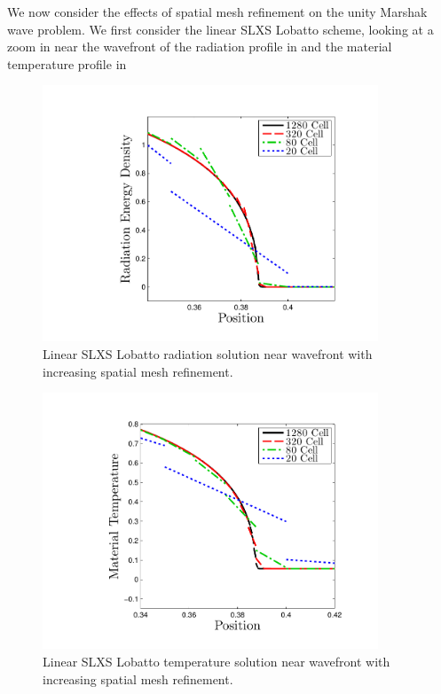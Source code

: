 We now consider the effects of spatial mesh refinement on the unity Marshak wave problem.  
We first consider the linear SLXS Lobatto scheme, looking at a zoom in near the wavefront of the radiation profile in  and the material temperature profile in 
\begin{figure}[!hbp]
\centering
\includegraphics[width=10cm,trim=1.0in  0.2in 0.5in 0.5in,clip=true]{chapter6_grey_radtran/Dissertation_Data/Reorder_Marshak_Zoom_Radiation_SL_Lobatto_P1_Cell_Refinement.pdf}
\caption{Linear SLXS Lobatto radiation solution near wavefront with increasing spatial mesh refinement.}
\label{fig:lobatto_convergence_rad}
\end{figure}
%
%
\begin{figure}[!htp]
\centering
\includegraphics[width=10cm,trim=1.0in  0.2in 0.5in 0.5in,clip=true]{chapter6_grey_radtran/Dissertation_Data/Reorder_Marshak_Zoom_Temperature_SL_Lobatto_P1_Cell_Refinement.pdf}
\caption{Linear SLXS Lobatto temperature solution near wavefront with increasing spatial mesh refinement.}
\label{fig:lobatto_convergence_temp}
\end{figure}
